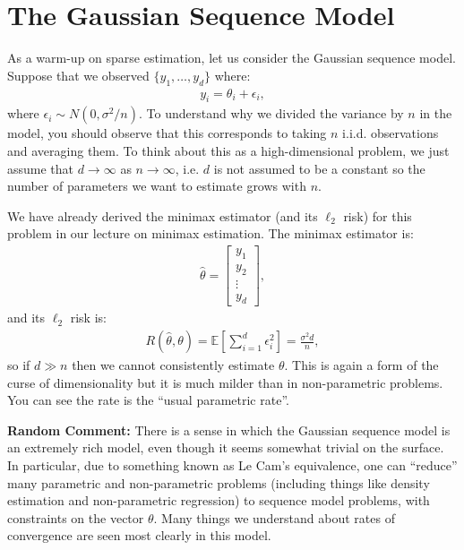\documentclass[twoside,12pt]{article}
\begin{document}
\section{The Gaussian Sequence Model}
As a warm-up on sparse estimation, let us consider the Gaussian sequence model. Suppose that we observed $\{y_1,\ldots,y_d\}$ where:
\begin{align*}
y_i = \theta_i + \epsilon_i,
\end{align*}
where $\epsilon_i \sim N(0,\sigma^2/n)$. To understand why we divided the variance by $n$ in the model, you should observe that this corresponds to taking $n$ i.i.d. observations and averaging them. To think about this as a high-dimensional problem, we just assume that $d \rightarrow \infty$ as $n \rightarrow \infty$, i.e. $d$ is not assumed to be a constant so the number of parameters we want to estimate grows with $n$.

We have already derived the minimax estimator (and its $\ell_2$ risk) for this problem in our lecture on minimax estimation. The minimax estimator is:
\begin{align*}
\widehat{\theta} = \left[ \begin{array}{c} y_1 \\ y_2 \\ \vdots \\ y_d \end{array}\right],
\end{align*}
and its $\ell_2$ risk is:
\begin{align*}
R(\widehat{\theta}, \theta) = \mathbb{E} \left[ \sum_{i=1}^d \epsilon_i^2 \right] = \frac{\sigma^2 d}{n},
\end{align*}
so if $d \gg n$ then we cannot consistently estimate $\theta$. This is again a form of the curse of dimensionality but it is much milder than in non-parametric problems. You can see the rate is the ``usual parametric rate''. 


{\bf Random Comment: } There is a sense in which the Gaussian sequence model is an extremely rich model, even though it seems somewhat trivial on the surface. In particular, due to something known as Le Cam's equivalence, one can ``reduce'' many parametric and non-parametric problems (including things like density estimation and non-parametric regression) to sequence model problems, with constraints on the vector $\theta$. Many things we understand about rates of convergence are seen most clearly in this model.
\end{document}
